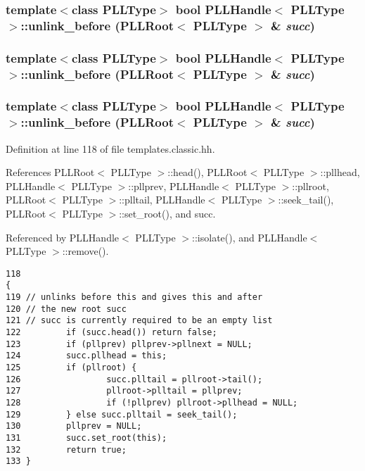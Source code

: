 \subsubsection{\setlength{\rightskip}{0pt plus 5cm}template$<$class PLLType$>$ bool PLLHandle$<$ {\bf PLLType} $>$::unlink\_\-before ({\bf PLLRoot}$<$ {\bf PLLType} $>$ \& {\em succ})\hspace{0.3cm}{\tt  [inline]}}\label{classPLLHandle_a36}


\subsubsection{\setlength{\rightskip}{0pt plus 5cm}template$<$class PLLType$>$ bool PLLHandle$<$ {\bf PLLType} $>$::unlink\_\-before ({\bf PLLRoot}$<$ {\bf PLLType} $>$ \& {\em succ})\hspace{0.3cm}{\tt  [inline]}}\label{classPLLHandle_a23}


\subsubsection{\setlength{\rightskip}{0pt plus 5cm}template$<$class PLLType$>$ bool PLLHandle$<$ {\bf PLLType} $>$::unlink\_\-before ({\bf PLLRoot}$<$ {\bf PLLType} $>$ \& {\em succ})\hspace{0.3cm}{\tt  [inline]}}\label{classPLLHandle_a10}




Definition at line 118 of file templates.classic.hh.

References PLLRoot$<$ PLLType $>$::head(), PLLRoot$<$ PLLType $>$::pllhead, PLLHandle$<$ PLLType $>$::pllprev, PLLHandle$<$ PLLType $>$::pllroot, PLLRoot$<$ PLLType $>$::plltail, PLLHandle$<$ PLLType $>$::seek\_\-tail(), PLLRoot$<$ PLLType $>$::set\_\-root(), and succ.

Referenced by PLLHandle$<$ PLLType $>$::isolate(), and PLLHandle$<$ PLLType $>$::remove().



\footnotesize\begin{verbatim}118                                                                      { 
119 // unlinks before this and gives this and after
120 // the new root succ
121 // succ is currently required to be an empty list
122         if (succ.head()) return false; 
123         if (pllprev) pllprev->pllnext = NULL; 
124         succ.pllhead = this; 
125         if (pllroot) { 
126                 succ.plltail = pllroot->tail(); 
127                 pllroot->plltail = pllprev; 
128                 if (!pllprev) pllroot->pllhead = NULL; 
129         } else succ.plltail = seek_tail(); 
130         pllprev = NULL; 
131         succ.set_root(this); 
132         return true; 
133 } 
\end{verbatim}\normalsize 


